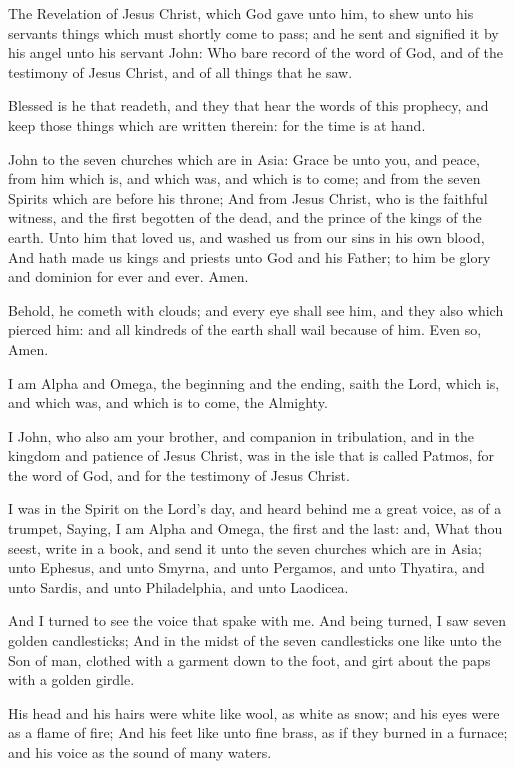 
\verse The Revelation of Jesus Christ, which God gave unto him, to shew unto his servants things which must shortly come to pass; and he sent and signified it by his angel unto his servant John: \verse Who bare record of the word of God, and of the testimony of Jesus Christ, and of all things that he saw.

\verse Blessed is he that readeth, and they that hear the words of this prophecy, and keep those things which are written therein: for the time is at hand.

\verse John to the seven churches which are in Asia: Grace be unto you, and peace, from him which is, and which was, and which is to come; and from the seven Spirits which are before his throne; \verse And from Jesus Christ, who is the faithful witness, and the first begotten of the dead, and the prince of the kings of the earth. Unto him that loved us, and washed us from our sins in his own blood, \verse And hath made us kings and priests unto God and his Father; to him be glory and dominion for ever and ever. Amen.

\verse Behold, he cometh with clouds; and every eye shall see him, and they also which pierced him: and all kindreds of the earth shall wail because of him. Even so, Amen.

\verse I am Alpha and Omega, the beginning and the ending, saith the Lord, which is, and which was, and which is to come, the Almighty.

\verse I John, who also am your brother, and companion in tribulation, and in the kingdom and patience of Jesus Christ, was in the isle that is called Patmos, for the word of God, and for the testimony of Jesus Christ.

\verse I was in the Spirit on the Lord's day, and heard behind me a great voice, as of a trumpet, \verse Saying, I am Alpha and Omega, the first and the last: and, What thou seest, write in a book, and send it unto the seven churches which are in Asia; unto Ephesus, and unto Smyrna, and unto Pergamos, and unto Thyatira, and unto Sardis, and unto Philadelphia, and unto Laodicea.

\verse And I turned to see the voice that spake with me. And being turned, I saw seven golden candlesticks; \verse And in the midst of the seven candlesticks one like unto the Son of man, clothed with a garment down to the foot, and girt about the paps with a golden girdle.

\verse His head and his hairs were white like wool, as white as snow; and his eyes were as a flame of fire; \verse And his feet like unto fine brass, as if they burned in a furnace; and his voice as the sound of many waters.

